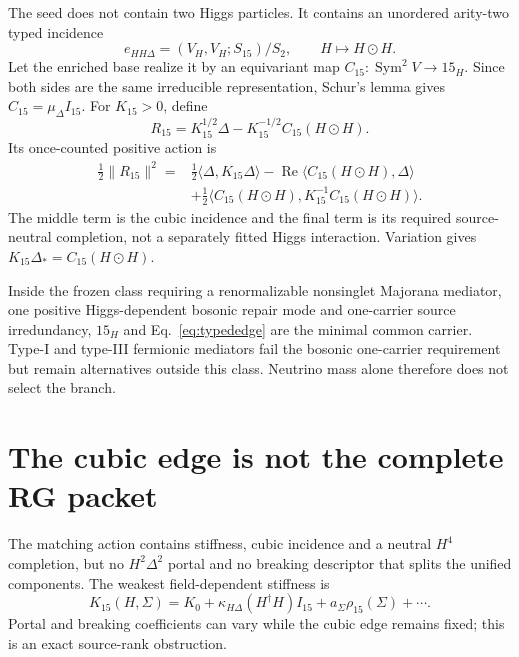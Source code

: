 The seed does not contain two Higgs particles. It contains an unordered
arity-two typed incidence
\begin{equation}
e_{HH\Delta}=(V_H,V_H;S_{15})/S_2,
\qquad H\mapsto H\odot H.
\label{eq:typededge}
\end{equation}
Let the enriched base realize it by an equivariant map
$C_{15}:\operatorname{Sym}^2V\to15_H$. Since both sides are the same
irreducible representation, Schur's lemma gives
$C_{15}=\mu_\Delta I_{15}$. For $K_{15}>0$, define
\begin{equation}
R_{15}=K_{15}^{1/2}\Delta-K_{15}^{-1/2}C_{15}(H\odot H).
\label{eq:matchingrow}
\end{equation}
Its once-counted positive action is
\begin{equation}
\begin{split}
\frac12\lVert R_{15}\rVert^2={}&
\frac12\langle\Delta,K_{15}\Delta\rangle
-\operatorname{Re}\langle C_{15}(H\odot H),\Delta\rangle\\
&+\frac12\langle C_{15}(H\odot H),
K_{15}^{-1}C_{15}(H\odot H)\rangle.
\end{split}
\label{eq:matchingaction}
\end{equation}
The middle term is the cubic incidence and the final term is its required
source-neutral completion, not a separately fitted Higgs interaction.
Variation gives $K_{15}\Delta_*=C_{15}(H\odot H)$.

Inside the frozen class requiring a renormalizable nonsinglet Majorana
mediator, one positive Higgs-dependent bosonic repair mode and one-carrier
source irredundancy, $15_H$ and Eq.~\eqref{eq:typededge} are the minimal common
carrier. Type-I and type-III fermionic mediators fail the bosonic one-carrier
requirement but remain alternatives outside this class. Neutrino mass alone
therefore does not select the branch.

\section{The cubic edge is not the complete RG packet}

The matching action contains stiffness, cubic incidence and a neutral $H^4$
completion, but no $H^2\Delta^2$ portal and no breaking descriptor that splits
the unified components. The weakest field-dependent stiffness is
\begin{equation}
K_{15}(H,\Sigma)=K_0+\kappa_{H\Delta}(H^\dagger H)I_{15}
+a_\Sigma\rho_{15}(\Sigma)+\cdots.
\end{equation}
Portal and breaking coefficients can vary while the cubic edge remains fixed;
this is an exact source-rank obstruction.

